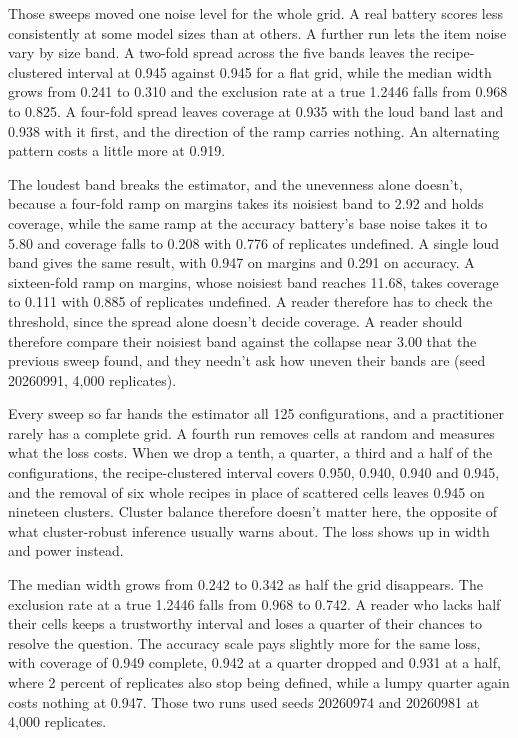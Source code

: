 Those sweeps moved one noise level for the whole grid. A real battery scores less consistently at some model sizes than at others. A further run lets the item noise vary by size band. A two-fold spread across the five bands leaves the recipe-clustered interval at 0.945 against 0.945 for a flat grid, while the median width grows from 0.241 to 0.310 and the exclusion rate at a true 1.2446 falls from 0.968 to 0.825. A four-fold spread leaves coverage at 0.935 with the loud band last and 0.938 with it first, and the direction of the ramp carries nothing. An alternating pattern costs a little more at 0.919.

The loudest band breaks the estimator, and the unevenness alone doesn't, because a four-fold ramp on margins takes its noisiest band to 2.92 and holds coverage, while the same ramp at the accuracy battery's base noise takes it to 5.80 and coverage falls to 0.208 with 0.776 of replicates undefined. A single loud band gives the same result, with 0.947 on margins and 0.291 on accuracy. A sixteen-fold ramp on margins, whose noisiest band reaches 11.68, takes coverage to 0.111 with 0.885 of replicates undefined. A reader therefore has to check the threshold, since the spread alone doesn't decide coverage. A reader should therefore compare their noisiest band against the collapse near 3.00 that the previous sweep found, and they needn't ask how uneven their bands are (seed 20260991, 4,000 replicates).

Every sweep so far hands the estimator all 125 configurations, and a practitioner rarely has a complete grid. A fourth run removes cells at random and measures what the loss costs. When we drop a tenth, a quarter, a third and a half of the configurations, the recipe-clustered interval covers 0.950, 0.940, 0.940 and 0.945, and the removal of six whole recipes in place of scattered cells leaves 0.945 on nineteen clusters. Cluster balance therefore doesn't matter here, the opposite of what cluster-robust inference usually warns about. The loss shows up in width and power instead.

The median width grows from 0.242 to 0.342 as half the grid disappears. The exclusion rate at a true 1.2446 falls from 0.968 to 0.742. A reader who lacks half their cells keeps a trustworthy interval and loses a quarter of their chances to resolve the question. The accuracy scale pays slightly more for the same loss, with coverage of 0.949 complete, 0.942 at a quarter dropped and 0.931 at a half, where 2 percent of replicates also stop being defined, while a lumpy quarter again costs nothing at 0.947. Those two runs used seeds 20260974 and 20260981 at 4,000 replicates.

